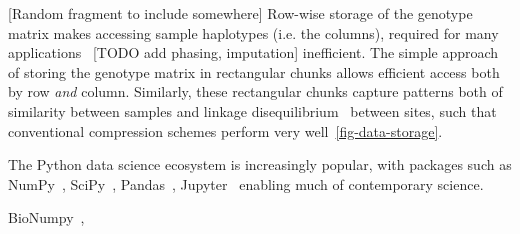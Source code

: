 \documentclass[a4paper,num-refs]{oup-contemporary}
\begin{document}


[Random fragment to include somewhere]
Row-wise storage of the genotype matrix makes accessing 
sample haplotypes (i.e. the columns),
required for many
applications~\cite[e.g.][]{durbin2014efficient,kelleher2019inferring} 
[TODO add phasing, imputation]
inefficient. The simple approach of storing the genotype matrix
in rectangular chunks allows efficient access both by row \emph{and}
column. Similarly, these rectangular chunks capture patterns
both of similarity between samples and linkage disequilibrium~\cite{mcvean2019linkage} 
between sites, such that conventional compression schemes 
perform very well~\ref{fig-data-storage}.


The Python data science ecosystem is increasingly popular, 
with packages such as NumPy~\citep{harris2020array},
SciPy~\citep{virtanen2020scipy},
Pandas~\citep{mckinney2010data},
Jupyter~\citep{kluyver2016jupyter}
enabling much of contemporary science.

BioNumpy~\citep{rand2022bionumpy}, 
\end{document}
